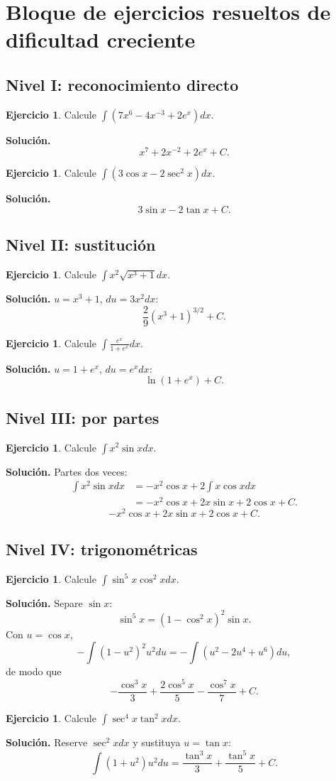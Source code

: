 \documentclass[12pt]{article}
\theoremstyle{definition}\newtheorem{definicion}[teorema]{Definición}\newtheorem{ejemplo}[teorema]{Ejemplo}\newtheorem{ejercicio}[teorema]{Ejercicio}
\theoremstyle{remark}\newtheorem*{observacion}{Observación}\newtheorem*{advertencia}{Advertencia}\newtheorem*{estrategia}{Estrategia}
\begin{document}
\section{Bloque de ejercicios resueltos de dificultad creciente}
\subsection{Nivel I: reconocimiento directo}
\begin{ejercicio}Calcule $\int(7x^6-4x^{-3}+2e^x)dx$.\end{ejercicio}
\textbf{Solución.}
\[\boxed{x^7+2x^{-2}+2e^x+C}.\]
\begin{ejercicio}Calcule $\int(3\cos x-2\sec^2x)dx$.\end{ejercicio}
\textbf{Solución.}
\[\boxed{3\sin x-2\tan x+C}.\]

\subsection{Nivel II: sustitución}
\begin{ejercicio}Calcule $\int x^2\sqrt{x^3+1}dx$.\end{ejercicio}
\textbf{Solución.} $u=x^3+1$, $du=3x^2dx$:
\[\boxed{\frac{2}{9}(x^3+1)^{3/2}+C}.\]
\begin{ejercicio}Calcule $\int\frac{e^x}{1+e^x}dx$.\end{ejercicio}
\textbf{Solución.} $u=1+e^x$, $du=e^xdx$:
\[\boxed{\ln(1+e^x)+C}.\]

\subsection{Nivel III: por partes}
\begin{ejercicio}Calcule $\int x^2\sin xdx$.\end{ejercicio}
\textbf{Solución.} Partes dos veces:
\begin{align*}
\int x^2\sin xdx&=-x^2\cos x+2\int x\cos xdx\\
&=-x^2\cos x+2x\sin x+2\cos x+C.
\end{align*}
\[\boxed{-x^2\cos x+2x\sin x+2\cos x+C}.\]

\subsection{Nivel IV: trigonométricas}
\begin{ejercicio}Calcule $\int\sin^5x\cos^2xdx$.\end{ejercicio}
\textbf{Solución.} Separe $\sin x$:
\[\sin^5x=(1-\cos^2x)^2\sin x.\]
Con $u=\cos x$,
\[-\int(1-u^2)^2u^2du=-\int(u^2-2u^4+u^6)du,\]
de modo que
\[\boxed{-\frac{\cos^3x}{3}+\frac{2\cos^5x}{5}-\frac{\cos^7x}{7}+C}.\]
\begin{ejercicio}Calcule $\int\sec^4x\tan^2xdx$.\end{ejercicio}
\textbf{Solución.} Reserve $\sec^2x dx$ y sustituya $u=\tan x$:
\[\int(1+u^2)u^2du=\boxed{\frac{\tan^3x}{3}+\frac{\tan^5x}{5}+C}.\]
\end{document}
